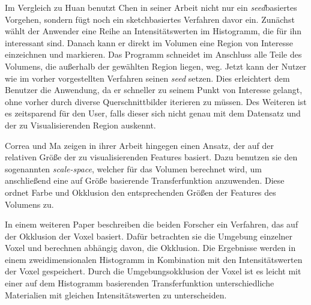 Im Vergleich zu Huan \cite{huang2003rgvis} benutzt Chen  in seiner Arbeit \cite{chen2006sketch} nicht nur ein \textit{seed}basiertes Vorgehen, sondern fügt noch ein sketchbasiertes Verfahren davor ein.
Zunächst wählt der Anwender eine Reihe an Intensitätswerten im Histogramm, die für ihn interessant sind. Danach kann er direkt im Volumen eine Region von Interesse einzeichnen und markieren. Das Programm schneidet im Anschluss alle Teile des Volumens, die außerhalb der gewählten Region liegen, weg. Jetzt kann der Nutzer wie im vorher vorgestellten Verfahren seinen \textit{seed} setzen.
Dies erleichtert dem Benutzer die Anwendung, da er schneller zu seinem Punkt von Interesse gelangt, ohne vorher durch diverse Querschnittbilder iterieren zu müssen. Des Weiteren ist es zeitsparend für den User, falls dieser sich nicht genau mit dem Datensatz und der zu Visualisierenden Region auskennt.


Correa und Ma zeigen in ihrer Arbeit \cite{correa2008size} hingegen einen Ansatz, der auf der relativen Größe der zu visualisierenden Features basiert.
Dazu benutzen sie den sogenannten \textit{scale-space}, welcher für das Volumen berechnet wird, um anschließend eine auf Größe basierende Transferfunktion anzuwenden. Diese ordnet Farbe und Okklusion den entsprechenden Größen der Features des Volumens zu.


In einem weiteren Paper \cite{correa2009occlusion} beschreiben die beiden Forscher ein Verfahren, das auf der Okklusion der Voxel basiert.
Dafür betrachten sie die Umgebung einzelner Voxel und berechnen abhängig davon, die Okklusion. Die Ergebnisse werden in einem zweidimensionalen Histogramm in Kombination mit den Intensitätswerten der Voxel gespeichert.
Durch die Umgebungsokklusion der Voxel ist es leicht mit einer auf dem Histogramm basierenden Transferfunktion unterschiedliche Materialien mit gleichen Intensitätswerten zu unterscheiden.


